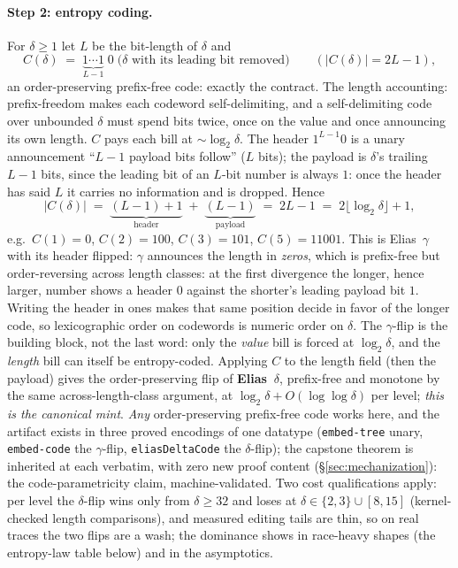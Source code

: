 \documentclass[11pt]{article}
\newcommand{\code}[1]{\texttt{#1}}
\begin{document}
\paragraph{Step 2: entropy coding.} For $\delta \ge 1$ let $L$ be the
bit-length of $\delta$ and
\[
  C(\delta) \;=\; \underbrace{1\cdots1}_{L-1}\;0\;\bigl(\delta
  \text{ with its leading bit removed}\bigr)
  \qquad (|C(\delta)| = 2L-1),
\]
an order-preserving prefix-free code: exactly the contract. The
length accounting: prefix-freedom makes each codeword
self-delimiting, and a self-delimiting code over unbounded $\delta$
must spend bits twice, once on the value and once announcing its own
length. $C$ pays each bill at $\sim\!\log_2\delta$. The header
$1^{L-1}0$ is a unary announcement ``$L{-}1$ payload bits follow''
($L$ bits); the payload is $\delta$'s trailing $L{-}1$ bits, since
the leading bit of an $L$-bit number is always $1$: once the header
has said $L$ it carries no information and is dropped. Hence
\[
  |C(\delta)| \;=\; \underbrace{(L{-}1) + 1}_{\text{header}}
  \;+\; \underbrace{(L{-}1)}_{\text{payload}}
  \;=\; 2L - 1 \;=\; 2\lfloor \log_2 \delta \rfloor + 1,
\]
e.g.\ $C(1) = 0$, $C(2) = 100$, $C(3) = 101$, $C(5) = 11001$. This
is Elias~$\gamma$ with
its header flipped: $\gamma$ announces the length in \emph{zeros},
which is prefix-free but order-reversing across length classes:
at the first divergence the longer, hence larger, number shows a
header $0$ against the shorter's leading payload bit $1$. Writing
the header in ones makes that same position decide in favor of the
longer code, so lexicographic order on codewords is numeric order on
$\delta$. The $\gamma$-flip is the building block, not the last
word: only the \emph{value} bill is forced at $\log_2 \delta$, and
the \emph{length} bill can itself be entropy-coded. Applying $C$ to
the length field (then the payload) gives the order-preserving flip
of \textbf{Elias~$\delta$}, prefix-free and monotone by the same
across-length-class argument, at $\log_2 \delta + O(\log \log
\delta)$ per level; \emph{this is the canonical mint}.
\emph{Any} order-preserving prefix-free
code works here, and the artifact exists in three proved encodings
of one datatype (\code{embed-tree} unary, \code{embed-code} the
$\gamma$-flip, \code{eliasDeltaCode} the $\delta$-flip); the capstone
theorem is inherited at each verbatim, with zero new proof content
(\S\ref{sec:mechanization}): the code-parametricity claim,
machine-validated. Two cost qualifications apply: per level the $\delta$-flip
wins only from $\delta \ge 32$ and loses at $\delta \in \{2,3\} \cup
[8,15]$ (kernel-checked length comparisons), and measured editing
tails are thin, so on real traces the two flips are a wash; the
dominance shows in race-heavy shapes (the entropy-law table below)
and in the asymptotics.
\end{document}
